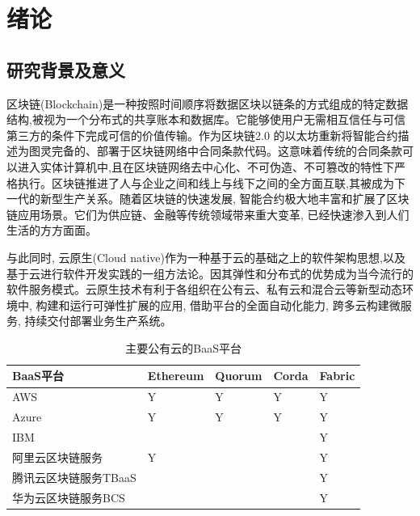 \chapter{绪论}

\section{研究背景及意义}

区块链(Blockchain)是一种按照时间顺序将数据区块以链条的方式组成的特定数据结构,被视为一个分布式的共享账本和数据库。它能够使用户无需相互信任与可信第三方的条件下完成可信的价值传输\cite{SurveyofEnterpriseBlockchains}。作为区块链2.0 的以太坊\footnotemark[1]重新将智能合约描述为图灵完备的、部署于区块链网络中合同条款代码。这意味着传统的合同条款可以进入实体计算机中,且在区块链网络去中心化、不可伪造、不可篡改的特性下严格执行。区块链推进了人与企业之间和线上与线下之间的全方面互联,其被成为下一代的新型生产关系。随着区块链的快速发展, 智能合约极大地丰富和扩展了区块链应用场景。它们为供应链、金融等传统领域带来重大变革, 已经快速渗入到人们生活的方方面面。

与此同时, 云原生(Cloud native)作为一种基于云的基础之上的软件架构思想,以及基于云进行软件开发实践的一组方法论。因其弹性和分布式的优势成为当今流行的软件服务模式。云原生技术有利于各组织在公有云、私有云和混合云等新型动态环境中, 构建和运行可弹性扩展的应用, 借助平台的全面自动化能力, 跨多云构建微服务, 持续交付部署业务生产系统。

{\footnotesize
\begin{longtable}[h]{m{100pt} m{50pt} m{50pt} m{50pt} m{50pt}}
    \caption[主要公有云的BaaS平台]{主要公有云的BaaS平台} \label{major_BaaS_platforms} \\
        \toprule  
        \textbf{BaaS平台}&\textbf{Ethereum}&\textbf{Quorum}&\textbf{Corda}&\textbf{Fabric}\\
        \hline
        
        AWS&Y&Y&Y&Y\\

        Azure&Y&Y&Y&Y\\

        IBM& & & &Y\\

        阿里云区块链服务&Y& & &Y\\

        腾讯云区块链服务TBaaS& & & &Y\\

        华为云区块链服务BCS& & & &Y\\
        \bottomrule
    \end{longtable}
}

